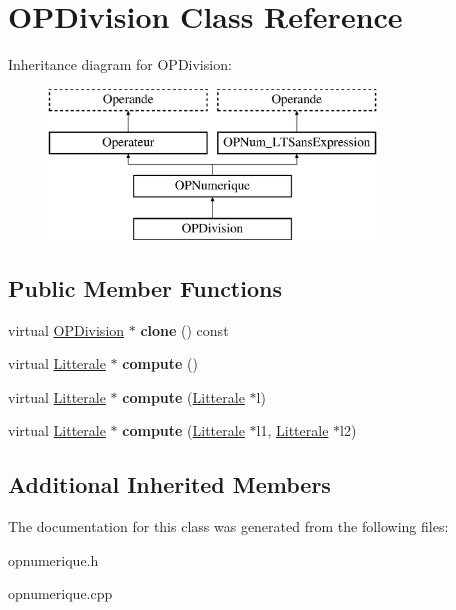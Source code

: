 \hypertarget{class_o_p_division}{}\section{O\+P\+Division Class Reference}
\label{class_o_p_division}
Inheritance diagram for O\+P\+Division\+:\begin{figure}[H]
\begin{center}
\leavevmode
\includegraphics[height=4.000000cm]{class_o_p_division}
\end{center}
\end{figure}
\subsection*{Public Member Functions}
\begin{DoxyCompactItemize}
\item 
virtual \hyperlink{class_o_p_division}{O\+P\+Division} $\ast$ {\bfseries clone} () const \hypertarget{class_o_p_division_a44f273e86a016e7cc740940a93dfe6bb}{}\label{class_o_p_division_a44f273e86a016e7cc740940a93dfe6bb}

\item 
virtual \hyperlink{class_litterale}{Litterale} $\ast$ {\bfseries compute} ()\hypertarget{class_o_p_division_ab1fd1dd980e13a2f6e2f8d4992e20a21}{}\label{class_o_p_division_ab1fd1dd980e13a2f6e2f8d4992e20a21}

\item 
virtual \hyperlink{class_litterale}{Litterale} $\ast$ {\bfseries compute} (\hyperlink{class_litterale}{Litterale} $\ast$l)\hypertarget{class_o_p_division_a2e46542094502a4b8d8743d82ad1d678}{}\label{class_o_p_division_a2e46542094502a4b8d8743d82ad1d678}

\item 
virtual \hyperlink{class_litterale}{Litterale} $\ast$ {\bfseries compute} (\hyperlink{class_litterale}{Litterale} $\ast$l1, \hyperlink{class_litterale}{Litterale} $\ast$l2)\hypertarget{class_o_p_division_a5903fe056c0541a188c2ce9fd6a510c5}{}\label{class_o_p_division_a5903fe056c0541a188c2ce9fd6a510c5}

\end{DoxyCompactItemize}
\subsection*{Additional Inherited Members}


The documentation for this class was generated from the following files\+:\begin{DoxyCompactItemize}
\item 
opnumerique.\+h\item 
opnumerique.\+cpp\end{DoxyCompactItemize}
